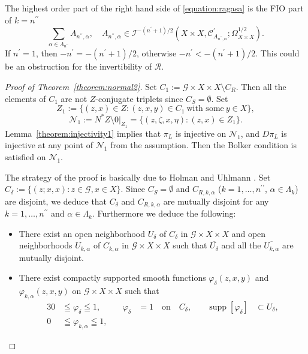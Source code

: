 \documentclass[a4paper,11pt,reqno]{amsart}
\theoremstyle{definition}
\theoremstyle{remark}
\begin{document}
%
%
The highest order part of the right hand side of \eqref{equation:ragasa} is 
the FIO part of $k=n^{\prime\prime}$
%
%
$$
\sum_{\alpha \in \Lambda_{n^{\prime\prime}}}
A_{n^{\prime\prime},\alpha},
\quad
A_{n^{\prime\prime},\alpha}
\in
\mathcal{I}^{-(n^\prime+1)/2}
(X{\times}X,\mathcal{C}_{A_{n^{\prime\prime},\alpha}}^\prime;\Omega_{X{\times}X}^{1/2}).
$$
%
%
If $n^\prime=1$, then $-n^\prime=-(n^\prime+1)/2$, otherwise 
$-n^\prime<-(n^\prime+1)/2$. 
This could be an obstruction for the invertibility of $\mathcal{R}$. 
%
%
\begin{proof}[Proof of Theorem~\ref{theorem:normal2}]
Set $C_1:=\mathcal{G}{\times}X{\times}X\setminus{C_R}$. 
Then all the elements of $C_1$ are not $Z$-conjugate triplets since $C_S=\emptyset$. 
Set 
%
%
$$
Z_1:=\{(z,x) \in Z : (z,x,y) \in C_1 \ \text{with some} \ y \in X\},
$$
%
%
$$
\mathcal{N}_1
:=
N^\ast{Z}\setminus0\vert_{Z_1}
=
\{(z,\zeta,x,\eta) : (z,x) \in Z_1\}.
$$
%
%
Lemma~\ref{theorem:injectivity1} implies that $\pi_L$ is injective on $\mathcal{N}_1$, 
and $D\pi_L$ is injective at any point of $\mathcal{N}_1$ from the assumption.  
Then the Bolker condition is satisfied on $\mathcal{N}_1$. 
%
%
\par
%
% 
The strategy of the proof is basically due to Holman and Uhlmann \cite{HolmanUhlmann}. 
Set $C_\delta:=\{(z;x,x) : z \in \mathcal{G}, x \in X\}$. 
Since $C_S=\emptyset$ and 
$C_{R,k,\alpha}$ ($k=1,\dotsc,n^{\prime\prime}$, $\alpha \in \Lambda_k$) are disjoint, 
we deduce that $C_\delta$ and $C_{R,k,\alpha}$ are mutually disjoint for any 
$k=1,\dotsc,n^{\prime\prime}$ and $\alpha \in \Lambda_k$. 
Furthermore we deduce the following:
%
%
\begin{itemize}
\item 
There exist an open neighborhood $U_\delta$ of $C_\delta$ in $\mathcal{G}{\times}X{\times}X$ and 
open neighborhoods $U_{k,\alpha}$ of $C_{k,\alpha}$ in $\mathcal{G}{\times}X{\times}X$ such that 
$\overline{U_\delta}$ and all the $\overline{U_{k,\alpha}}$ are mutually disjoint. 
\item 
There exist compactly supported smooth functions 
$\varphi_\delta(z,x,y)$ and $\varphi_{k,\alpha}(z,x,y)$ 
on $\mathcal{G}{\times}X{\times}X$ such that  
%
%
\begin{alignat*}{3}
  0
& \leqq 
  \varphi_\delta
  \leqq
  1,
& \quad
  \varphi_\delta
& =
  1 
  \quad\text{on}\quad
  C_\delta,
& \quad
  \operatorname{supp}[\varphi_\delta]
& \subset
  U_\delta,
\\
  0
& \leqq 
  \varphi_{k,\alpha}
  \leqq
  1,
& \quad

\end{alignat*}
\end{itemize}
\end{proof}
\end{document}
